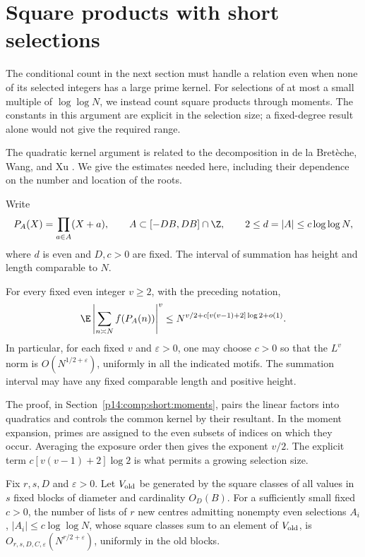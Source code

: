 \section{Square products with short selections}
\label{p13:short:section}

The conditional count in the next section must handle a relation
even when none of its selected integers has a large prime kernel.
For selections of at most a small multiple of \(\log\log N\),
we instead count square products through moments. The constants
in this argument are explicit in the selection size; a
fixed-degree result alone would not give the required range.

The quadratic kernel argument is related to the decomposition
in de la Bret\`eche, Wang, and Xu
\cite[Lemmas~6.2--6.3]{bretwngxu2026}. We give the estimates
needed here, including their dependence on the number and
location of the roots.


Write
\[
 P_A(X)=\prod_{a\in A}(X+a),\qquad
 A\subset[-DB,DB]\cap\Z,
 \qquad 2\le d=|A|\le c\log\log N,
\]
where $d$ is even and $D,c>0$ are fixed.  The interval of summation
has height and length comparable to $N$.

\begin{proposition}
\label{p13:short:moments}
For every fixed even integer \(v\ge2\), with the preceding notation,
\begin{equation}
 \E\left|\sum_{n\asymp N}f(P_A(n))\right|^v
 \le N^{v/2+c[v(v-1)+2]\log2+o(1)}.
 \label{p13:short:moment-bound}
\end{equation}
In particular, for each fixed \(v\) and \(\varepsilon>0\),
one may choose \(c>0\) so that the \(L^v\) norm is
\(O(N^{1/2+\varepsilon})\), uniformly in all the indicated
motifs. The summation interval may have any fixed comparable
length and positive height.
\end{proposition}

The proof, in Section~\ref{p14:comp:short:moments}, pairs the linear
factors into quadratics and controls the common kernel by their
resultant.  In the moment expansion, primes are assigned to the even
subsets of indices on which they occur.  Averaging the exposure order
then gives the exponent $v/2$.  The explicit term
$c[v(v-1)+2]\log2$ is what permits a growing selection size.

\begin{corollary}
\label{p13:short:old-space}
Fix \(r,s,D\) and \(\varepsilon>0\). Let \(V_{\rm old}\)
be generated by the square classes of all values in \(s\)
fixed blocks of diameter and cardinality \(O_D(B)\).
For a sufficiently small fixed \(c>0\), the number of
lists of \(r\) new centres admitting nonempty even
selections \(A_i\), \(|A_i|\le c\log\log N\), whose
square classes sum to an element of \(V_{\rm old}\), is
\(O_{r,s,D,C,\varepsilon}(N^{r/2+\varepsilon})\),
uniformly in the old blocks.
\end{corollary}


